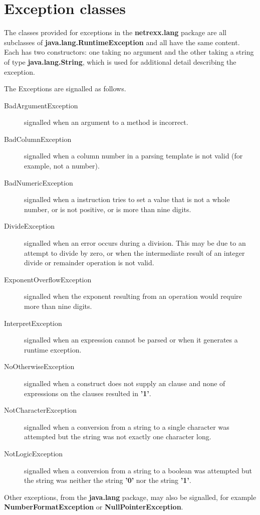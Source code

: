 \section{Exception classes}\label{refnlexcep}
 
The classes provided for exceptions in the \textbf{netrexx.lang} package
are all subclasses of \textbf{java.lang.RuntimeException} and all have
the same content.  Each has two constructors: one taking no argument and
the other taking a string of type \textbf{java.lang.String}, which is
used for additional detail describing the exception.
 
The Exceptions are signalled as follows.
\begin{description}
\item[BadArgumentException]\label{refexpbae}
 signalled when an argument to a method is incorrect.
\item[BadColumnException]\label{refexpbce}
 signalled when a column number in a parsing template is not valid
(for example, not a number).
\item[BadNumericException]\label{refexpbne}
 signalled when a  instruction tries to set
a value that is not a whole number, or is not positive, or is more than
nine digits.
\item[DivideException]\label{refexpdve}
 signalled when an error occurs during a division.  This may be due
to an attempt to divide by zero, or when the intermediate result of an
integer divide or remainder operation is not valid.
\item[ExponentOverflowException]\label{refexpeoe}
signalled when the exponent resulting from an operation would
require more than nine digits.
\item[InterpretException]\label{refexpie}
signalled when an  expression cannot be parsed or when it generates a runtime exception.
\item[NoOtherwiseException]\label{refexpnoe}
 signalled when a  construct does not supply an
 clause and none of expressions on the 
clauses resulted in \textbf{'1'}.
\item[NotCharacterException]\label{refexpnce}
 signalled when a conversion from a string to a single character was
attempted but the string was not exactly one character long.
\item[NotLogicException]\label{refexpnle}
 signalled when a conversion from a string to a boolean was
attempted but the string was neither the string \textbf{'0'} nor the
string \textbf{'1'}.
\end{description}
 
Other exceptions, from the \textbf{java.lang} package, may also be
signalled, for example \textbf{NumberFormatException}
or \textbf{NullPointerException}.
